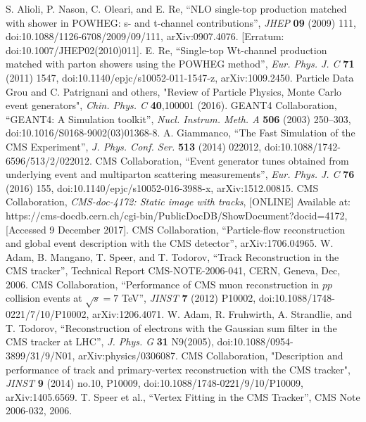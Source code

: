 \begin{thebibliography}{9}
S. Alioli, P. Nason, C. Oleari, and E. Re, “NLO single-top production matched with shower in POWHEG: s- and t-channel contributions”, {\it JHEP} {\bf 09} (2009) 111, doi:10.1088/1126-6708/2009/09/111, arXiv:0907.4076. [Erratum: doi:10.1007/JHEP02(2010)011].
E. Re, “Single-top Wt-channel production matched with parton showers using the POWHEG method”, {\it Eur. Phys. J. C} {\bf 71} (2011) 1547, doi:10.1140/epjc/s10052-011-1547-z, arXiv:1009.2450.
{Particle Data Grou} and C. Patrignani and others, "Review of Particle Physics, Monte Carlo event generators", {\it Chin. Phys. C} {\bf 40},100001 (2016).
GEANT4 Collaboration, “GEANT4: A Simulation toolkit”, {\it Nucl. Instrum. Meth. A} \textbf{506} (2003) 250–303, doi:10.1016/S0168-9002(03)01368-8.
A. Giammanco, “The Fast Simulation of the CMS Experiment”, {\it J. Phys. Conf. Ser.} \textbf{513} (2014) 022012, doi:10.1088/1742-6596/513/2/022012.
CMS Collaboration, “Event generator tunes obtained from underlying event and multiparton scattering measurements”, 
{\it Eur. Phys. J. C} {\bf 76} (2016) 155, doi:10.1140/epjc/s10052-016-3988-x, arXiv:1512.00815.
CMS Collaboration, {\it CMS-doc-4172: Static image with tracks}, [ONLINE] Available at: https://cms-docdb.cern.ch/cgi-bin/PublicDocDB/ShowDocument?docid=4172, [Accessed 9 December 2017].
CMS Collaboration, ``Particle-flow reconstruction and global event description with the CMS detector'', arXiv:1706.04965.
W. Adam, B. Mangano, T. Speer, and T. Todorov, “Track Reconstruction in the CMS tracker”, Technical Report CMS-NOTE-2006-041, CERN, Geneva, Dec, 2006.
CMS Collaboration, ``Performance of CMS muon reconstruction in $pp$ collision events at $\sqrt{s}=7$ TeV'', {\it JINST} {\bf 7} (2012) P10002, doi:10.1088/1748-0221/7/10/P10002, arXiv:1206.4071.
W. Adam, R. Fruhwirth, A. Strandlie, and T. Todorov, “Reconstruction of electrons with the Gaussian sum filter in the CMS tracker at LHC”,
{\it J. Phys. G} {\bf 31} N9(2005), doi:10.1088/0954-3899/31/9/N01, arXiv:physics/0306087.
CMS Collaboration, "Description and performance of track and primary-vertex reconstruction with the CMS tracker", {\it JINST} {\bf 9} (2014) no.10,  P10009, doi:10.1088/1748-0221/9/10/P10009, arXiv:1405.6569.
T. Speer et al., “Vertex Fitting in the CMS Tracker”, CMS Note 2006-032, 2006.

\end{thebibliography}
